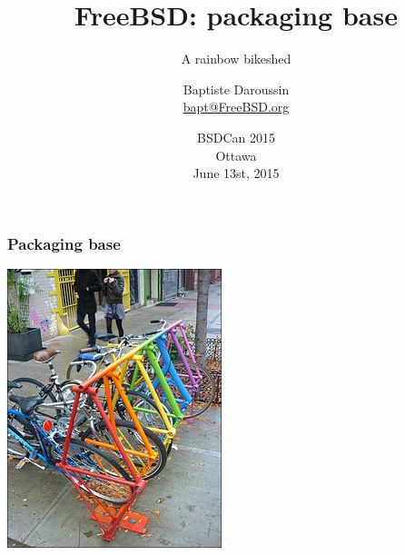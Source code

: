 
\usepackage{color}
\usepackage{listings}
\newcommand{\prestitle}{BSDCan 2015}
\lstset{
	numbers=none,
	frame=l,
	aboveskip=0pt, belowskip=0pt
}

\title{FreeBSD: packaging base}
\subtitle{A rainbow bikeshed}
\author{Baptiste Daroussin \\ \url{bapt@FreeBSD.org}}
\date{BSDCan 2015 \\ Ottawa \\ June 13st, 2015}


\begin{frame}[plain]
	\titlepage
\end{frame}

\begin{frame}
	\frametitle{Packaging base}
	\center
	\includegraphics[scale=0.6]{rainbow-bikeshed.jpg}
\end{frame}


